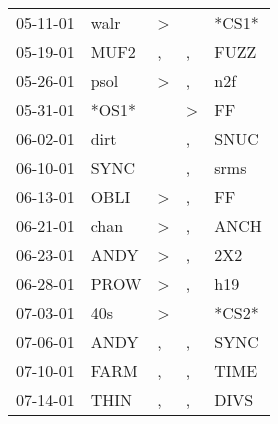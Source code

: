 \begin{supertabular}{p{0.07\textwidth}p{0.06\textwidth}p{0.02\textwidth}p{0.02\textwidth}p{0.06\textwidth}}
          05-11-01\textsuperscript{} &           walr\textsuperscript{} &     \textgreater &                  &                            *CS1* \\
          05-19-01\textsuperscript{} &           MUF2\textsuperscript{} &                , &                , &           FUZZ\textsuperscript{} \\
          05-26-01\textsuperscript{} &           psol\textsuperscript{} &     \textgreater &                , &            n2f\textsuperscript{} \\
          05-31-01\textsuperscript{} &                            *OS1* &                  &     \textgreater &             FF\textsuperscript{} \\
          06-02-01\textsuperscript{} &           dirt\textsuperscript{} &                  &                , &           SNUC\textsuperscript{} \\
          06-10-01\textsuperscript{} &           SYNC\textsuperscript{} &                  &                , &           srms\textsuperscript{} \\
          06-13-01\textsuperscript{} &           OBLI\textsuperscript{} &     \textgreater &                , &             FF\textsuperscript{} \\
          06-21-01\textsuperscript{} &           chan\textsuperscript{} &     \textgreater &                , &           ANCH\textsuperscript{} \\
          06-23-01\textsuperscript{} &           ANDY\textsuperscript{} &     \textgreater &                , &            2X2\textsuperscript{} \\
          06-28-01\textsuperscript{} &           PROW\textsuperscript{} &     \textgreater &                , &            h19\textsuperscript{} \\
          07-03-01\textsuperscript{} &            40s\textsuperscript{} &     \textgreater &                  &                            *CS2* \\
          07-06-01\textsuperscript{} &           ANDY\textsuperscript{} &                , &                , &           SYNC\textsuperscript{} \\
          07-10-01\textsuperscript{} &           FARM\textsuperscript{} &                , &                , &           TIME\textsuperscript{} \\
          07-14-01\textsuperscript{} &           THIN\textsuperscript{} &                , &                , &           DIVS\textsuperscript{} \\

\end{supertabular}
